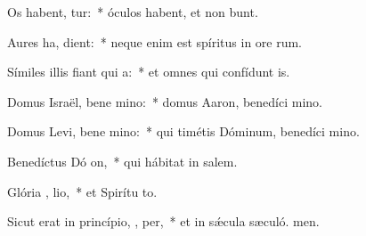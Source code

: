 \item Os habent,   tur:~* óculos habent, et non bunt.
\item Aures ha,   dient:~* neque enim est spíritus in ore rum.
\item Símiles illis fiant qui  a:~* et omnes qui confídunt  is.
\item Domus Israël, bene mino:~* domus Aaron, benedíci mino.
\item Domus Levi, bene mino:~* qui timétis Dóminum, benedíci mino.
\item Benedíctus Dó  on,~* qui hábitat in salem.
\item Glória ,  lio,~* et Spirítu to.
\item Sicut erat in princípio,  ,  per,~* et in sǽcula sæculó. men.
